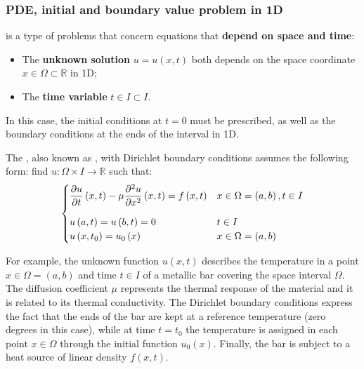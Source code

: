 \subsubsection{PDE, initial and boundary value problem in 1D}

 is a type of problems that concern equations that \textbf{depend on space and time}:
\begin{itemize}
    \item The \textbf{unknown solution} $u = u\left(x,t\right)$ both depends on the space coordinate $x \in \Omega \subset \mathbb{R}$ in 1D;
    
    \item The \textbf{time variable} $t \in I \subset I$.
\end{itemize}
In this case, the initial conditions at $t = 0$ must be prescribed, as well as the boundary conditions at the ends of the interval in 1D.

\highspace
The , also known as , with Dirichlet boundary conditions assumes the following form: find $u: \Omega \times I \rightarrow \mathbb{R}$ such that:
\begin{equation}
    \begin{cases}
        \dfrac{\partial u}{\partial t}\left(x,t\right) - \mu \dfrac{\partial^{2}u}{\partial x^{2}}\left(x,t\right) = f\left(x,t\right) & x \in \Omega = \left(a,b\right), t \in I \vspace{1em} \\
        u\left(a,t\right) = u\left(b,t\right) = 0 & t \in I \\
        u\left(x, t_{0}\right) = u_{0}\left(x\right) & x \in \Omega = \left(a,b\right)
    \end{cases}
\end{equation}

\begin{examplebox}
    For example, the unknown function $u \left(x,t\right)$ describes the temperature in a point $x \in \Omega = \left(a,b\right)$ and time $t \in I$ of a metallic bar covering the space interval $\Omega$. The diffusion coefficient $\mu$ represents the thermal response of the material and it is related to its thermal conductivity. The Dirichlet boundary conditions express the fact that the ends of the bar are kept at a reference temperature (zero degrees in this case), while at time $t = t_{0}$ the temperature is assigned in each point $x \in \Omega$ through the initial function $u_{0}\left(x\right)$. Finally, the bar is subject to a heat source of linear density $f\left(x,t\right)$.
\end{examplebox}